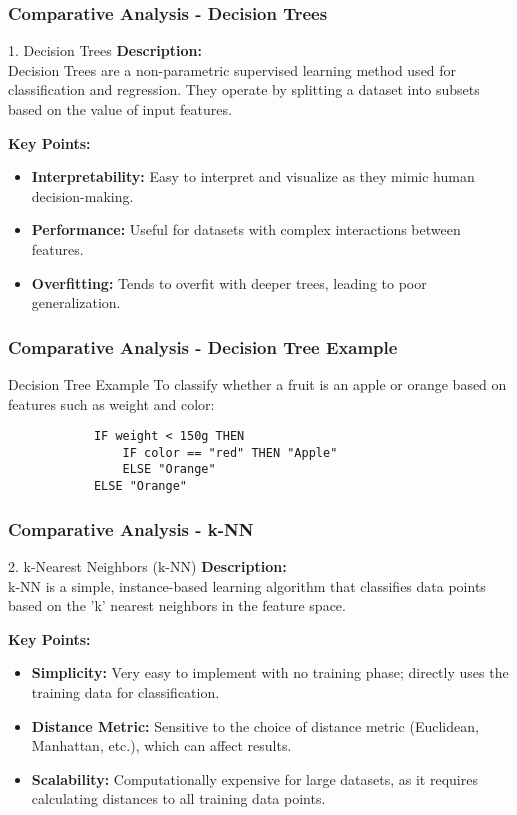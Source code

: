 \documentclass[aspectratio=169]{beamer}
\begin{document}
\begin{frame}[fragile]
    \frametitle{Comparative Analysis - Decision Trees}
    \begin{block}{1. Decision Trees}
        \textbf{Description:} \\
        Decision Trees are a non-parametric supervised learning method used for classification and regression. 
        They operate by splitting a dataset into subsets based on the value of input features.
        
        \textbf{Key Points:}
        \begin{itemize}
            \item \textbf{Interpretability:} Easy to interpret and visualize as they mimic human decision-making.
            \item \textbf{Performance:} Useful for datasets with complex interactions between features.
            \item \textbf{Overfitting:} Tends to overfit with deeper trees, leading to poor generalization.
        \end{itemize}
    \end{block}
\end{frame}

\begin{frame}[fragile]
    \frametitle{Comparative Analysis - Decision Tree Example}
    \begin{block}{Decision Tree Example}
        To classify whether a fruit is an apple or orange based on features such as weight and color:
        \begin{lstlisting}
            IF weight < 150g THEN
                IF color == "red" THEN "Apple"
                ELSE "Orange"
            ELSE "Orange"
        \end{lstlisting}
    \end{block}
\end{frame}

\begin{frame}[fragile]
    \frametitle{Comparative Analysis - k-NN}
    \begin{block}{2. k-Nearest Neighbors (k-NN)}
        \textbf{Description:} \\
        k-NN is a simple, instance-based learning algorithm that classifies data points based on the 
        'k' nearest neighbors in the feature space.

        \textbf{Key Points:}
        \begin{itemize}
            \item \textbf{Simplicity:} Very easy to implement with no training phase; directly uses the training 
            data for classification.
            \item \textbf{Distance Metric:} Sensitive to the choice of distance metric (Euclidean, Manhattan, etc.), 
            which can affect results.
            \item \textbf{Scalability:} Computationally expensive for large datasets, as it requires calculating 
            distances to all training data points.
        \end{itemize}
    \end{block}
\end{frame}
\end{document}

